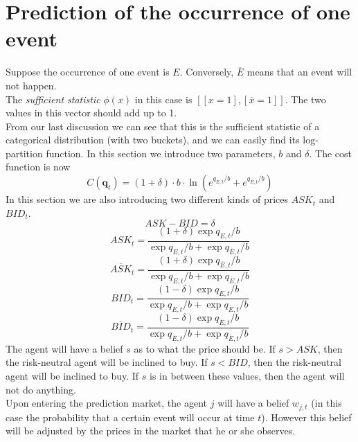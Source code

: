 \documentclass{article}
\begin{document}
\section{Prediction of the occurrence of one event}
Suppose the occurrence of one event is $E$. Conversely, $\overline{E}$ means that an event will not happen. \\
The \emph{sufficient statistic} $\phi(x)$ in this case is $[[x=1], [\overline{x}=1]]$. The two values in this vector should add up to 1.\\
From our last discussion we can see that this is the sufficient statistic of a categorical distribution (with two buckets), and we can easily find its log-partition function. In this section we introduce two parameters, $b$ and $\delta$. The cost function is now
\begin{displaymath}
C(\textbf{q}_t)=(1+\delta)\cdot b \cdot \ln({e^{q_{E,t}/b}+e^{q_{\overline{E},t}/b}})
\end{displaymath}
In this section we are also introducing two different kinds of prices $ASK_t$ and $BID_t$.
\begin{displaymath}
ASK-BID = \delta
\end{displaymath}
\begin{displaymath}
ASK_t=\frac{(1+\delta)\exp{q_{E,t}/b}}{\exp{q_{E,t}/b}+\exp{q_{\overline{E},t}/b}}
\end{displaymath}
\begin{displaymath}
\overline{ASK}_t=\frac{(1+\delta)\exp{q_{\overline{E},t}/b}}{\exp{q_{E,t}/b}+\exp{q_{\overline{E},t}/b}}
\end{displaymath}
\begin{displaymath}
BID_t=\frac{(1-\delta)\exp{q_{E,t}/b}}{\exp{q_{E,t}/b}+\exp{q_{\overline{E},t}/b}}
\end{displaymath}
\begin{displaymath}
\overline{BID}_t=\frac{(1-\delta)\exp{q_{\overline{E},t}/b}}{\exp{q_{E,t}/b}+\exp{q_{\overline{E},t}/b}}
\end{displaymath}
The agent will have a belief $s$ as to what the price should be. If $s>ASK$, then the risk-neutral agent will be inclined to buy. If $s<BID$, then the risk-neutral agent will be inclined to buy. If $s$ is in between these values, then the agent will not do anything. \\
Upon entering the prediction market, the agent $j$ will have a belief $w_{j,t}$ (in this case the probability that a certain event will occur at time $t$). However this belief will be adjusted by the prices in the market that he or she observes.
\end{document}
